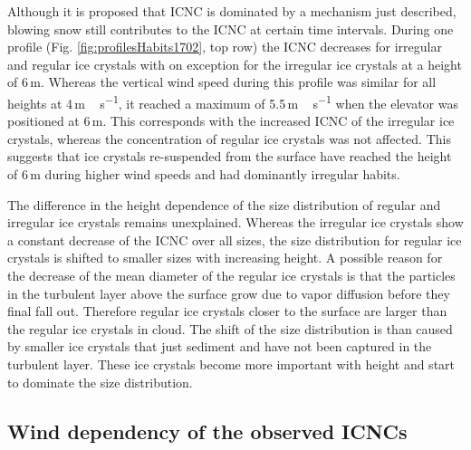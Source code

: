 \documentclass[draft,linenumbers]{agujournal}
\begin{document}
Although it is proposed that ICNC is dominated by a mechanism just described, blowing snow still contributes to the ICNC at certain time intervals. During one profile  (Fig. \ref{fig:profilesHabits1702}, top row) the ICNC decreases for irregular and regular ice crystals with on exception for the irregular ice crystals at a height of 6\,\si{m}. Whereas the vertical wind speed during this profile was similar for all heights at 4\,\si{m\,s^{-1}}, it reached a maximum of 5.5\,\si{m\,s^{-1}} when the elevator was positioned at 6\,\si{m}. This corresponds with the increased ICNC of the irregular ice crystals, whereas the concentration of regular ice crystals was not affected. This suggests that ice crystals re-suspended from the surface have reached the height of 6\,\si{m} during higher wind speeds and had dominantly irregular habits. 

The difference in the height dependence of the size distribution of regular and irregular ice crystals remains unexplained. Whereas the irregular ice crystals show a constant decrease of the ICNC over all sizes, the size distribution for regular ice crystals is shifted to smaller sizes with increasing height. A possible reason for the decrease of the mean diameter of the regular ice crystals is that the particles in the turbulent layer above the surface grow due to vapor diffusion before they final fall out. Therefore regular ice crystals closer to the surface are larger than the regular ice crystals in cloud. The shift of the size distribution is than caused by smaller ice crystals that just sediment and have not been captured in the turbulent layer. These ice crystals become more important with height and start to dominate the size distribution.


\subsection{Wind dependency of the observed ICNCs}
\end{document}
